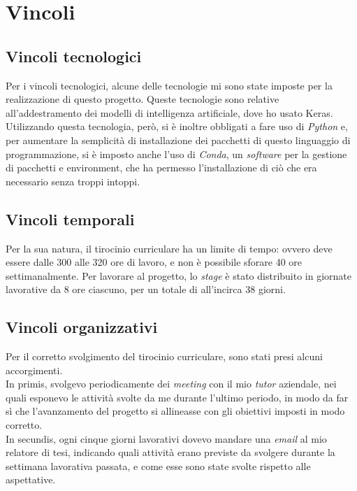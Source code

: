 \section{Vincoli}\label{sec:restrictions}

\subsection{Vincoli tecnologici}\noindent
Per i vincoli tecnologici, alcune delle tecnologie mi sono state imposte per la realizzazione di questo progetto.
Queste tecnologie sono relative all'addestramento dei modelli di intelligenza artificiale, dove ho usato Keras.
Utilizzando questa tecnologia, però, si è inoltre obbligati a fare uso di \textit{Python} e, per aumentare la semplicità di installazione dei pacchetti di questo linguaggio di programmazione, si è imposto anche l'uso di \textit{Conda}, un \textit{software} per la gestione di pacchetti e \gls{environment}, che ha permesso l'installazione di ciò che era necessario senza troppi intoppi.

\subsection{Vincoli temporali}\label{subsec:time-restrictions}\noindent
Per la sua natura, il tirocinio curriculare ha un limite di tempo: ovvero deve essere dalle 300 alle 320 ore di lavoro, e non è possibile sforare 40 ore settimanalmente.
Per lavorare al progetto, lo \textit{stage} è stato distribuito in giornate lavorative da 8 ore ciascuno, per un totale di all'incirca 38 giorni.

\subsection{Vincoli organizzativi}\noindent
Per il corretto svolgimento del tirocinio curriculare, sono stati presi alcuni accorgimenti.\\
In primis, svolgevo periodicamente dei \textit{meeting} con il mio \textit{tutor} aziendale, nei quali esponevo le attività svolte da me durante l'ultimo periodo, in modo da far sì che l'avanzamento del progetto si allineasse con gli obiettivi imposti in modo corretto.\\
In secundis, ogni cinque giorni lavorativi dovevo mandare una \textit{email} al mio relatore di tesi, indicando quali attività erano previste da svolgere durante la settimana lavorativa passata, e come esse sono state svolte rispetto alle aspettative.

